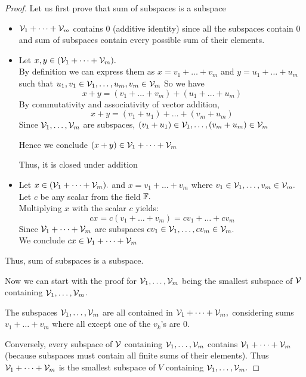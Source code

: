 \begin{proof}
	Let us first prove that sum of subspaces is a subspace
\leavevmode
\begin{itemize}
	\item $\mathcal{V}_1 + \dots + \mathcal{V}_m$ contains 0 (additive identity) since all the subspaces contain 0 and sum of subspaces contain every possible sum of their elements.
	\item Let $x, y \in (\mathcal{V}_1 + \dots + \mathcal{V}_m).$ \\
	By definition we can express them as $x = v_1 + \dots + v_m$ and $y = u_1 + \dots + u_m$ such that $u_1, v_1 \in \mathcal{V}_1, \dots, u_m, v_m \in \mathcal{V}_m$
	So we have \[x + y = (v_1 + \dots + v_m) + (u_1 + \dots + u_m)\]
	By commutativity and associativity of vector addition, \[x + y = (v_1 + u_1) + \dots + (v_m + u_m)\]
	Since $\mathcal{V}_1, \dots, \mathcal{V}_m$ are subspaces, $(v_1 + u_1) \in \mathcal{V}_1, \dots, (v_m + u_m) \in \mathcal{V}_m$
	
	Hence we conclude $(x + y) \in \mathcal{V}_1 + \dots + \mathcal{V}_m$
	
	Thus, it is closed under addition
	\item Let $x \in (\mathcal{V}_1 + \dots + \mathcal{V}_m).$ and $x = v_1 + \dots + v_m$ where $v_1 \in \mathcal{V}_1, \dots, v_m \in \mathcal{V}_m.$ Let $c$ be any scalar from the field $\mathbb{F}.$\\
	Multiplying $x$ with the scalar $c$ yields:\[cx = c(v_1 + \dots + v_m) = cv_1 + \dots + cv_m\]
	Since $\mathcal{V}_1 + \dots + \mathcal{V}_m$ are subspaces $cv_1 \in \mathcal{V}_1, \dots , cv_m \in \mathcal{V}_m.$\\
	We conclude $cx \in \mathcal{V}_1 + \dots + \mathcal{V}_m$
\end{itemize}
Thus, sum of subspaces is a subspace.

Now we can start with the proof for $\mathcal{V}_1, \dots , \mathcal{V}_m$ being the smallest subspace of $\mathcal{V}$ containing $\mathcal{V}_1, \dots , \mathcal{V}_m$.

The subspaces $\mathcal{V}_1, \dots , \mathcal{V}_m$ are all contained in $\mathcal{V}_1 + \dots + \mathcal{V}_m,$ considering sums $v_1 + \dots + v_m$ where all except one of the $v_k$’s are 0. 

Conversely, every subspace of $\mathcal{V}$ containing $\mathcal{V}_1, \dots , \mathcal{V}_m$ contains $\mathcal{V}_1 + \dots + \mathcal{V}_m$ (because subspaces
must contain all finite sums of their elements). Thus $\mathcal{V}_1 + \dots + \mathcal{V}_m$ is the smallest
subspace of $V$ containing $\mathcal{V}_1, \dots , \mathcal{V}_m.$
\end{proof}
